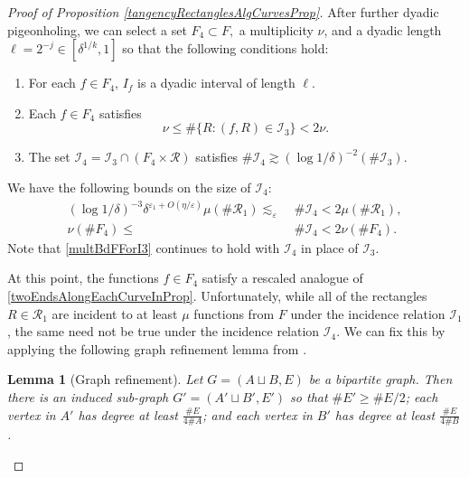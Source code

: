 \documentclass[letterpaper, reqno,11pt]{article}
\numberwithin{equation}{section}
\newcommand{\eps}{\varepsilon}
\numberwithin{thm}{section}
\newtheorem{lem}[thm]{Lemma}
\theoremstyle{remark}
\begin{document}
\begin{proof}[Proof of Proposition \ref{tangencyRectanglesAlgCurvesProp}]
After further dyadic pigeonholing, we can select a set $F_4\subset F,$ a multiplicity $\nu$, and a dyadic length $\ell=2^{-j}\in[\delta^{1/k},1]$ so that the following conditions hold:
\begin{enumerate}
\item[(a)] 
For each $f\in F_4$, $I_f$ is a dyadic interval of length $\ell$.
\item[(b)] Each $f\in F_4$ satisfies 
\begin{equation}\label{multBdFForI3}
\nu\leq\# \{R\colon (f,R)\in \mathcal{I}_3\}< 2\nu.
\end{equation}
\item[(c)] The set $\mathcal{I}_4=\mathcal{I}_3\cap (F_4\times\mathcal{R})$ satisfies $\#\mathcal{I}_4\gtrsim (\log 1/\delta)^{-2}(\#\mathcal{I}_3)$.
\end{enumerate}
We have the following bounds on the size of $\mathcal{I}_4$:
\begin{equation}\label{sizeOfI3}
\begin{split}
(\log 1/\delta)^{-3}\delta^{\eps_1+O(\eta/\eps)}\mu(\#\mathcal{R}_1)\lesssim_\eps\phantom{.} & \#\mathcal{I}_4 <2\mu(\#\mathcal{R}_1),\\
 \nu(\#F_4) \leq\phantom{_\eps .} & \#\mathcal{I}_4 <2\nu(\#F_4).
\end{split}
\end{equation}
Note that \eqref{multBdFForI3} continues to hold with $\mathcal{I}_4$ in place of $\mathcal{I}_3$. 


\medskip
{} 
At this point, the functions $f\in F_4$ satisfy a rescaled analogue of \eqref{twoEndsAlongEachCurveInProp}. Unfortunately, while all of the rectangles $R\in\mathcal{R}_1$ are incident to at least $\mu$ functions from $F$ under the incidence relation $\mathcal{I}_1$, the same need not be true under the incidence relation $\mathcal{I}_4$. We can fix this by applying the following graph refinement lemma from \cite{dg}.

\begin{lem}[Graph refinement]\label{graphRefinementLemma}
Let $G = (A\sqcup B, E)$ be a bipartite graph. Then there is an induced sub-graph $G'=(A'\sqcup B', E')$ so that $\#E'\geq \#E/2$; each vertex in $A'$ has degree at least $\frac{\#E}{4\#A}$; and each vertex in $B'$ has degree at least $\frac{\#E}{4\#B}$.
\end{lem}


\end{proof}
\end{document}
